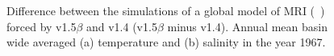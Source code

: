 \documentclass[dvipdfmx]{elsarticle_mod}
\begin{document}
\begin{figure}[h]
\centering
  \caption{Difference between the simulations of a global model of MRI (\citeauthor{Urakawa_et_al_2020}~\citeyear{Urakawa_et_al_2020}) forced by v1.5$\beta$ and v1.4 (v1.5$\beta$ minus v1.4). Annual mean basin wide averaged (a) temperature and (b) salinity in the year 1967.}
  \label{fig:zmts-v1_5-v1_4}
\end{figure}
\end{document}
